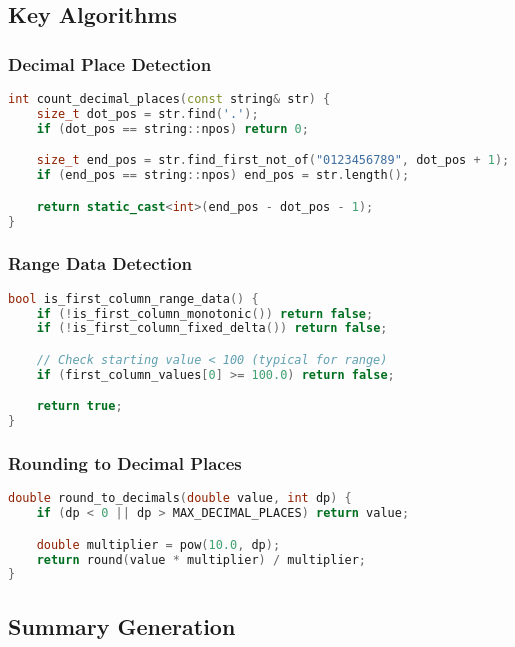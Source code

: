 \subsection{Key Algorithms}

\subsubsection{Decimal Place Detection}

\begin{lstlisting}[language=C++]
int count_decimal_places(const string& str) {
    size_t dot_pos = str.find('.');
    if (dot_pos == string::npos) return 0;

    size_t end_pos = str.find_first_not_of("0123456789", dot_pos + 1);
    if (end_pos == string::npos) end_pos = str.length();

    return static_cast<int>(end_pos - dot_pos - 1);
}
\end{lstlisting}

\subsubsection{Range Data Detection}

\begin{lstlisting}[language=C++]
bool is_first_column_range_data() {
    if (!is_first_column_monotonic()) return false;
    if (!is_first_column_fixed_delta()) return false;

    // Check starting value < 100 (typical for range)
    if (first_column_values[0] >= 100.0) return false;

    return true;
}
\end{lstlisting}

\subsubsection{Rounding to Decimal Places}

\begin{lstlisting}[language=C++]
double round_to_decimals(double value, int dp) {
    if (dp < 0 || dp > MAX_DECIMAL_PLACES) return value;

    double multiplier = pow(10.0, dp);
    return round(value * multiplier) / multiplier;
}
\end{lstlisting}

\subsection{Summary Generation}

